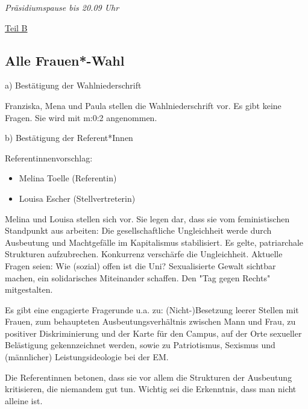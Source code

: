 \documentclass[ngerman,headheight=70pt]{scrartcl}
\begin{document}
    \textit{Präsidiumspause bis 20.09 Uhr}

    \vspace{0.5cm}
    {\Large \underline{Teil B}}


    \subsection{Alle Frauen*-Wahl}

    a) Bestätigung der Wahlniederschrift

    Franziska, Mena und Paula stellen die Wahlniederschrift vor. Es gibt keine
    Fragen. Sie wird mit m:0:2 angenommen.

    b) Bestätigung der Referent*Innen

    Referentinnenvorschlag:
    \begin{itemize}
        \item Melina Toelle (Referentin)
        \item Louisa Escher (Stellvertreterin)
    \end{itemize}

    Melina und Louisa stellen sich vor. Sie legen dar, dass sie vom feministischen
    Standpunkt aus arbeiten: Die gesellschaftliche Ungleichheit werde durch
    Ausbeutung und Machtgefälle im Kapitalismus stabilisiert. Es gelte, patriarchale
    Strukturen aufzubrechen. Konkurrenz verschärfe die Ungleichheit. Aktuelle
    Fragen seien: Wie (sozial) offen ist die Uni? Sexualisierte Gewalt sichtbar
    machen, ein solidarisches Miteinander schaffen. Den "Tag gegen Rechts"
    mitgestalten.

    Es gibt eine engagierte Fragerunde u.a. zu: (Nicht-)Besetzung leerer Stellen
    mit Frauen, zum behaupteten Ausbeutungsverhältnis zwischen Mann und Frau, zu
    positiver Diskriminierung und der Karte für den Campus, auf der Orte
    sexueller Belästigung gekennzeichnet werden, sowie zu Patriotismus, Sexismus
    und (männlicher) Leistungsideologie bei der EM.

    Die Referentinnen betonen, dass sie vor allem die Strukturen der Ausbeutung
    kritisieren, die niemandem gut tun. Wichtig sei die Erkenntnis, dass man nicht
    alleine ist.
\end{document}
